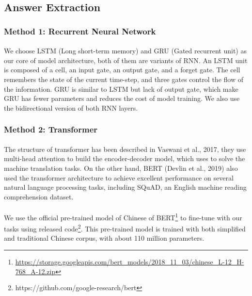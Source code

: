 \documentclass{article}
\begin{document}
\subsection{Answer Extraction}
\subsubsection{Method 1: Recurrent Neural Network}
\paragraph{}
We choose LSTM\cite{hochreiter1997lstm} (Long short-term memory) and GRU\cite{cho2014learning} (Gated recurrent unit) as our core of model architecture, both of them are variants of RNN. An LSTM unit is composed of a cell, an input gate, an output gate, and a forget gate. The cell remembers the state of the current time-step, and three gates control the flow of the information. GRU is similar to LSTM but lack of output gate, which make GRU has fewer parameters and reduces the cost of model training. We also use the bidirectional version of both RNN layers.

\subsubsection{Method 2: Transformer}
\paragraph{}
The structure of transformer\cite{vaswani2017attention} has been described in Vaswani et al., 2017, they use multi-head attention to build the encoder-decoder model, which uses to solve the machine translation tasks. On the other hand, BERT\cite{devlin2018bert} (Devlin et al., 2019) also used the transformer architecture to achieve excellent performance on several natural language processing tasks, including SQuAD, an English machine reading comprehension dataset.

\paragraph{}
We use the official pre-trained model of Chinese of BERT\footnote{\url{https://storage.googleapis.com/bert_models/2018_11_03/chinese_L-12_H-768_A-12.zip}} to fine-tune with our tasks using released code\footnote{\label{run_squad}https://github.com/google-research/bert}. This pre-trained model is trained with both simplified and traditional Chinese corpus, with about 110 million parameters.
\end{document}
